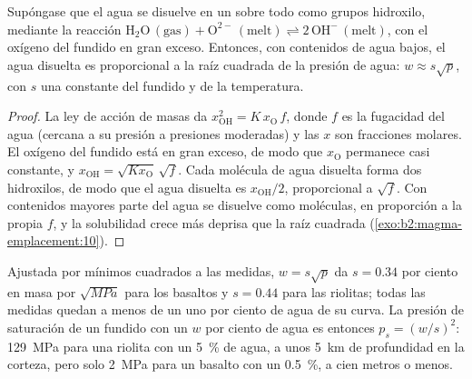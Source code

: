 \begin{proposition}\label{prop:b2:magma-emplacement:sqrt}
Supóngase que el agua se disuelve en un  sobre todo como grupos hidroxilo, mediante
la reacción $\mathrm{H_2O\,(gas)} + \mathrm{O^{2-}\,(melt)} \rightleftharpoons
2\,\mathrm{OH^-\,(melt)}$, con el oxígeno del fundido en gran exceso. Entonces, con
contenidos de agua bajos, el agua disuelta es proporcional a la raíz cuadrada de
la presión de agua: $w \approx s\sqrt{p}$, con $s$ una constante del fundido y de la
temperatura.
\end{proposition}

\begin{proof}
La ley de acción de masas da $x_{\mathrm{OH}}^2 = K\,x_{\mathrm{O}}\,f$, donde $f$ es
la fugacidad del agua (cercana a su presión a presiones moderadas) y las $x$
son fracciones molares. El oxígeno del fundido está en gran exceso, de modo que
$x_{\mathrm{O}}$ permanece casi constante, y $x_{\mathrm{OH}} = \sqrt{Kx_{\mathrm{O}}}\,
\sqrt f$. Cada molécula de agua disuelta forma dos hidroxilos, de modo que el agua
disuelta es $x_{\mathrm{OH}}/2$, proporcional a $\sqrt f$. Con contenidos mayores parte
del agua se disuelve como moléculas, en proporción a la propia $f$, y la
solubilidad crece más deprisa que la raíz cuadrada (\cref{exo:b2:magma-emplacement:10}).
\end{proof}

Ajustada por mínimos cuadrados a las medidas, $w = s\sqrt p$ da
$s = 0.34$ por ciento en masa por $\sqrt{\unit{MPa}}$ para los basaltos y
$s = 0.44$ para las riolitas; todas las medidas quedan a menos de un uno por ciento de
agua de su curva. La presión de saturación de un fundido con un $w$ por ciento
de agua es entonces $p_s = (w/s)^2$: \qty{129}{MPa} para una riolita con un
\qty{5}{\percent} de agua, a unos \qty{5}{km} de profundidad en la corteza, pero solo
\qty{2}{MPa} para un basalto con un \qty{0.5}{\percent}, a cien metros o menos.

